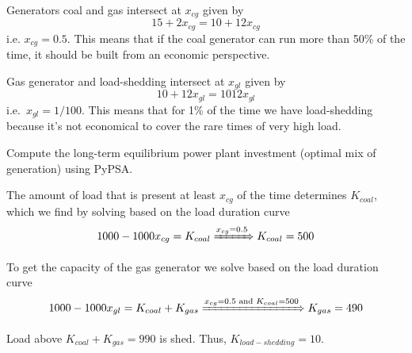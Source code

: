 \documentclass[11pt,a4paper,fleqn]{scrartcl}
\begin{document}
\begin{enumerate}[(a)]
 Generators coal and gas intersect at $x_{cg}$ given by
 \begin{equation*}
  15 + 2x_{cg} = 10 + 12x_{cg}
 \end{equation*}
 i.e. $x_{cg}=0.5$. This means that if the coal generator can run more than 50\% of the time, it should be built from an economic perspective.

 Gas generator and load-shedding intersect at $x_{gl}$ given by
 \begin{equation*}
  10 + 12x_{gl} = 1012x_{gl}
 \end{equation*}
 i.e.\ $x_{gl}=1/100$. This means that for 1\% of the time we have load-shedding because it's not economical to cover the rare times of very high load.

 \begin{shaded}\item Compute the long-term equilibrium power plant investment (optimal mix of generation) using PyPSA.\end{shaded}

 The amount of load that is present at least $x_{cg}$ of the time determines $K_{coal}$, which we find by solving based on the load duration curve
 \begin{equation*}
  1000-1000x_{cg} = K_{coal} \xRightarrow{x_{cg}=0.5} K_{coal} = 500
 \end{equation*}

 To get the capacity of the gas generator we solve based on the load duration curve
 \begin{equation*}
  1000-1000x_{gl}=K_{coal}+ K_{gas} \xRightarrow{x_{cg}=0.5 \text{ and } K_{coal}=500} K_{gas} = 490
 \end{equation*}

 Load above $K_{coal}+ K_{gas}=990$ is shed. Thus, $K_{load-shedding}=10$.


\end{enumerate}
\end{document}
